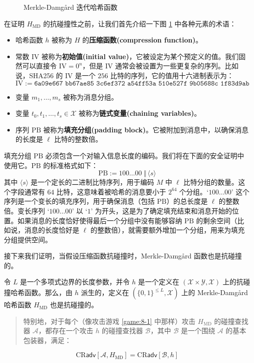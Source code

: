 \begin{figure}
	\centering
	
	\caption{Merkle-Damg{\aa}rd 迭代哈希函数}
	\label{fig:8-5}
\end{figure}

在证明 $H_\mathrm{MD}$ 的抗碰撞性之前，让我们首先介绍一下图 \ref{fig:8-5} 中各种元素的术语：
\begin{itemize}
	\item 哈希函数 $h$ 被称为 $H$ 的\textbf{压缩函数(compression function)}。
	\item 常数 $\mathrm{IV}$ 被称为\textbf{初始值(initial value)}，它被设定为某个预定义的值。我们固然可以直接令 $\mathrm{IV}=0^n$，但是 $\mathrm{IV}$ 通常会被设置为一些更复杂的序列。比如说，SHA256 的 $\mathrm{IV}$ 是一个 $256$ 比特的序列，它的值用十六进制表示为：
	\[
	\mathrm{IV}:=\texttt{6a09e667 bb67ae85 3c6ef372 a54ff53a 510e527f 9b05688c 1f83d9ab 5be0cd19}
	\]
	\item 变量 $m_1,\dots,m_s$ 被称为消息分组。
	\item 变量 $t_0,t_1,\dots,t_s\in\mathcal{X}$ 被称为\textbf{链式变量(chaining variables)}。
	\item 序列 $\mathrm{PB}$ 被称为\textbf{填充分组(padding block)}。它被附加到消息中，以确保消息的长度是 $\ell$ 比特的整数倍。
\end{itemize}

填充分组 $\mathrm{PB}$ 必须包含一个对输入信息长度的编码。我们将在下面的安全证明中使用它。$\mathrm{PB}$ 的标准格式如下：
\[
\mathrm{PB}:= \boxed{100\dots 00\;\Vert\,\langle s \rangle}
\]
其中 $\langle s \rangle$ 是一个定长的二进制比特序列，用于编码 $M$ 中 $\ell$ 比特分组的数量。这个字段通常有 $64$ 比特，这意味着被哈希的消息要小于 $2^{64}$ 个分组。`$100\dots 00$' 这个序列是一个变长的填充序列，用于确保消息（包括 $\mathrm{PB}$）的总长度是 $\ell$ 的整数倍。变长序列 `$100\dots 00$' 以 `$1$' 为开头，这是为了确定填充结束和消息开始的位置。如果消息的长度恰好使得最后一个分组中没有能够容纳 $\mathrm{PB}$ 的剩余空间（比如说，消息的长度恰好是 $\ell$ 的整数倍），就需要额外增加一个分组，用来为填充分组提供空间。

\begin{snote}
接下来我们证明，当假设压缩函数抗碰撞时，Merkle-Damg{\aa}rd 函数也是抗碰撞的。
\end{snote}

\begin{theorem}\label{theo:8-3}
令 $L$ 是一个多项式边界的长度参数，并令 $h$ 是一个定义在 $(\mathcal{X}\times\mathcal{Y},\mathcal{X})$ 上的抗碰撞哈希函数。那么，由 $h$ 派生的，定义在 $\left(\{0,1\}^{\leq L},\mathcal{X}\right)$ 上的 Merkle-Damg{\aa}rd 哈希函数 $H_\mathrm{MD}$ 也是抗碰撞的。
\begin{quote}
特别地，对于每个（像攻击游戏 \ref{game:8-1} 中那样）攻击 $H_\mathrm{MD}$ 的碰撞查找器 $\mathcal{A}$，都存在一个攻击 $h$ 的碰撞查找器 $\mathcal{B}$，其中 $\mathcal{B}$ 是一个围绕 $\mathcal{A}$ 的基本包装器，满足：
\end{quote}
\[
\mathrm{CR}\mathsf{adv}[\mathcal{A},H_\mathrm{MD}]=\mathrm{CR}\mathsf{adv}[\mathcal{B},h]
\]
\end{theorem}

